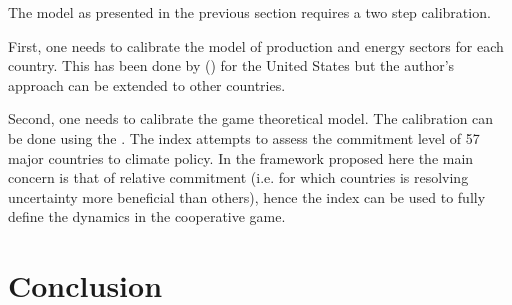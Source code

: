 \documentclass[american]{scrartcl}
\newcommand{\citein}[1]{\citeauthor{#1} (\citeyear{#1})}
\begin{document}
The model as presented in the previous section requires a two step calibration.

First, one needs to calibrate the model of production and energy sectors for each country. This has been done by \citein{Barnett2019} for the United States but the author's approach can be extended to other countries.

Second, one needs to calibrate the game theoretical model. The calibration can be done using the \citeauthor{Burck2020}. The index attempts to assess the commitment level of 57 major countries to climate policy. In the framework proposed here the main concern is that of relative commitment (i.e. for which countries is resolving uncertainty more beneficial than others), hence the index can be used to fully define the dynamics in the cooperative game.

\section{Conclusion}



\newpage
\nocite{*}
\printbibliography
\end{document}
